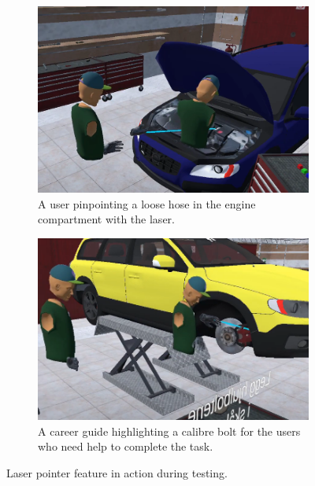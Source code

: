 \begin{figure}[]
  \centering
  \begin{subfigure}[b]{0.45\textwidth}
    \includegraphics[width=1\textwidth]{fig/phase_2/implementation/laser1.png}
    \caption{A user pinpointing a loose hose in the engine compartment with the laser.}
    \label{fig:laser1}
  \end{subfigure}
    \hfill%
  \begin{subfigure}[b]{0.45\textwidth}
    \includegraphics[width=1\textwidth]{fig/phase_2/implementation/laser2.PNG}
    \caption{A career guide highlighting a calibre bolt for the users who need help to complete the task.}
    \label{fig:laser2}
  \end{subfigure}
  \hfill%
  \caption{Laser pointer feature in action during testing.}
  \label{fig:phase2Laser}
\end{figure}


